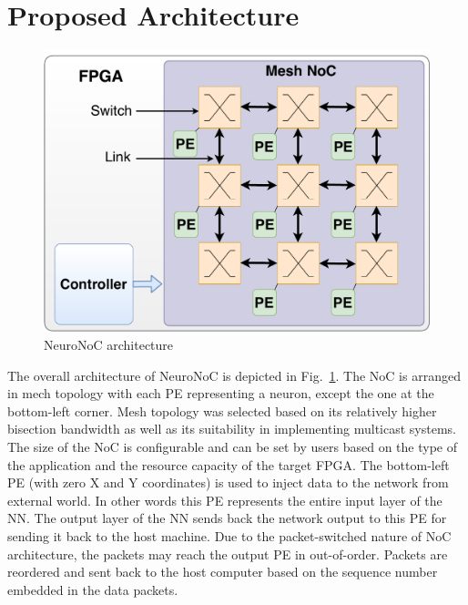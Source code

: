 \section{Proposed Architecture}

\begin{figure}
	\begin{center}
    \includegraphics[width=\columnwidth]{Figures/overall3.pdf}
    \caption{NeuroNoC architecture} 
    \end{center}
    \label{figure:neuronoc}
\end{figure}

The overall architecture of NeuroNoC is depicted in Fig.~\ref{figure:neuronoc}.
The NoC is arranged in mech topology with each PE representing a neuron, except the one at the bottom-left corner.
Mesh topology was selected based on its relatively higher bisection bandwidth as well as its suitability in implementing multicast systems. 
The size of the NoC is configurable and can be set by users based on the type of the application and the resource capacity of the target FPGA.
The bottom-left PE (with zero X and Y coordinates) is used to inject data to the network from external world.
In other words this PE represents the entire input layer of the NN.
The output layer of the NN sends back the network output to this PE for sending it back to the host machine.
Due to the packet-switched nature of NoC architecture, the packets may reach the output PE in out-of-order.
Packets are reordered and sent back to the host computer based on the sequence number embedded in the data packets.

